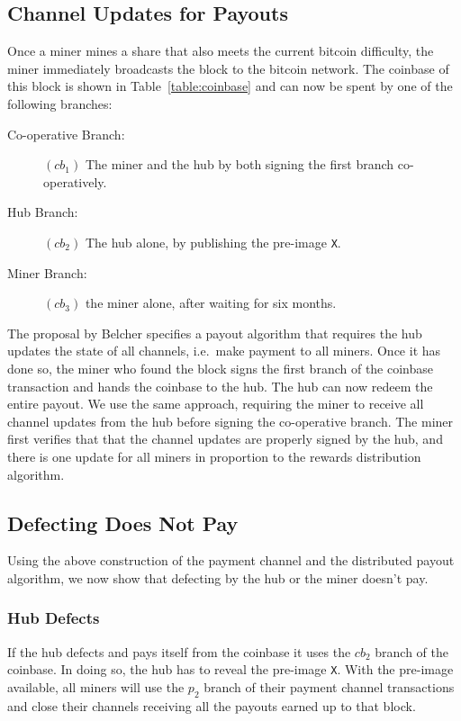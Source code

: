 \documentclass{article}
\begin{document}
\subsection{Channel Updates for Payouts}

Once a miner mines a share that also meets the current bitcoin
difficulty, the miner immediately broadcasts the block to the bitcoin
network. The coinbase of this block is shown in
Table~\ref{table:coinbase} and can now be spent by one of the following
branches:

\begin{description}
\item[Co-operative Branch:] $(cb_1)$ The miner and the hub by both signing the
  first branch co-operatively.
\item[Hub Branch:] $(cb_2)$ The hub alone, by publishing the pre-image \verb|X|.
\item[Miner Branch:] $(cb_3)$ the miner alone, after waiting for six months.
\end{description}

The proposal by Belcher specifies a payout algorithm that requires the
hub updates the state of all channels, i.e.\ make payment to all
miners. Once it has done so, the miner who found the block signs the
first branch of the coinbase transaction and hands the coinbase to the
hub. The hub can now redeem the entire payout. We use the same
approach, requiring the miner to receive all channel updates from the
hub before signing the co-operative branch. The miner first verifies
that that the channel updates are properly signed by the hub, and
there is one update for all miners in proportion to the rewards
distribution algorithm.

\subsection{Defecting Does Not Pay}\label{ref:defecting}

Using the above construction of the payment channel and the
distributed payout algorithm, we now show that defecting by the hub or
the miner doesn't pay.

\subsubsection{Hub Defects}\label{ref:hub-defects}

If the hub defects and pays itself from the coinbase it uses the
$cb_2$ branch of the coinbase. In doing so, the hub has to reveal the
pre-image \verb|X|. With the pre-image available, all miners will use
the $p_2$ branch of their payment channel transactions and close their
channels receiving all the payouts earned up to that block.
\end{document}
